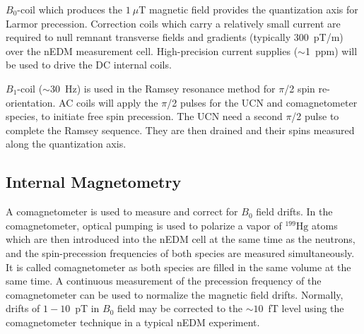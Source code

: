 
$B_0$-coil which produces the $1~\mu$T magnetic field provides the quantization axis for Larmor precession. Correction coils which carry a relatively small current are required to null remnant transverse fields and gradients (typically $300$~pT/m) over the nEDM measurement cell. High-precision current supplies ($\sim$1~ppm) will be used to drive the DC internal coils. 






$B_1$-coil ($\sim$30~Hz) is used in the Ramsey resonance method for $\pi$/2 spin re-orientation. AC coils will apply the $\pi$/2 pulses for the UCN and comagnetometer species, to initiate free spin precession. The UCN need a second $\pi$/2 pulse to complete the Ramsey sequence. They are then drained and their spins measured along the quantization axis.

\subsection{Internal Magnetometry}

A comagnetometer is used to measure and correct for  $B_0$ field drifts. 
In the comagnetometer, optical pumping is used to polarize a vapor of $^{199}\mathrm{Hg}$ atoms which are then introduced into the nEDM cell at the same time as the neutrons, and the spin-precession frequencies of both species are measured simultaneously. It is called comagnetometer as both species are filled in the same volume at the same time. A continuous measurement of the precession frequency of the comagnetometer can be used to normalize the magnetic field drifts. Normally, drifts of $1-10$~pT in $B_0$ field may be corrected to the $\sim10$~fT level using the comagnetometer technique in a typical nEDM experiment. 

